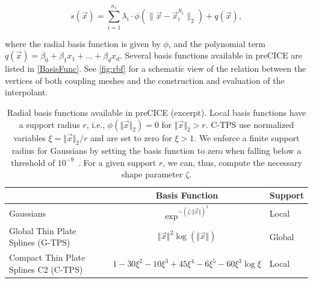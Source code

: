 \begin{equation*}
s \left( \vec{x} \right) = \sum\limits_{i=1}^{n_1} \lambda_{i} \cdot \phi \left( \| \vec{x} - \vec{x}^{S_1}_{i} \| _{2}\right) + q \left( \vec{x} \right) ,
\end{equation*}

where the radial basis function is given by $\phi$, and the polynomial term $q \left( \vec{x} \right) = \beta_{0} + \beta_{1} x_{1} + \ldots + \beta_{d} x_{d}$.
Several basis functions available in preCICE are listed in \autoref{BasisFunc}.
See \autoref{fig:rbf} for a schematic view of the relation between the vertices of both coupling meshes and the construction and evaluation of the interpolant.

\begin{table}[h!]
\centering
\caption{Radial basis functions available in preCICE (excerpt). Local basis functions have a support radius $r$, i.e., $\phi \left(\Vert \vec{x} \Vert_{2}\right) = 0$ for $\Vert \vec{x} \Vert_{2} > r$. C-TPS use normalized variables $\xi = \Vert \vec{x} \Vert_{2}/r$ and are set to zero for $\xi>1$. We enforce a finite support radius for Gaussians by setting the basis function to zero when falling below a threshold of $10^{-9}$~\cite{Lindner2017}. For a given support $r$, we can, thus, compute the necessary shape parameter $\zeta$.}
\label{BasisFunc}
\begin{tabular}{lcl}\toprule
& Basis Function & Support \\ \midrule
Gaussians    & $\exp^{-(\zeta \cdot \Vert \vec{x} \Vert)^{2}}$  & Local  \\
Global Thin Plate Splines (G-TPS) & $\Vert \vec{x} \Vert ^{2} \log(\Vert \vec{x} \Vert)$ & Global \\
Compact Thin Plate Splines C2 (C-TPS)  & $1 - 30\xi ^{2} - 10\xi ^{3} + 45\xi ^{4} - 6\xi ^{5} - 60\xi ^{3}\log\xi$   & Local  \\
\bottomrule
\end{tabular}
\end{table}

